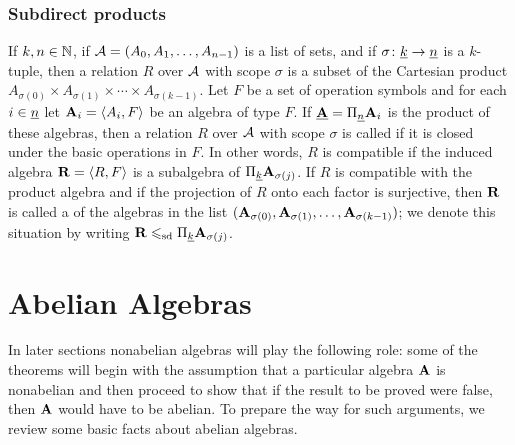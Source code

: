\subsubsection{Subdirect products}
If $k, n \in \mathbb{N}$, if $\mathcal{A} = (A_0, A_1, \dots, A_{n-1})$ is a list
of sets, and if $\sigma \colon \underline{k} \to \underline{n}$ is a $k$-tuple, 
then a relation $R$ over $\mathcal{A}$ with scope $\sigma$ is
a subset of the Cartesian product
$A_{\sigma(0)} \times A_{\sigma(1)} \times \cdots \times A_{\sigma(k-1)}$.
Let $F$ be a set of operation symbols and for each $i\in \underline{n}$
let $\mathbf{A}_i = \langle A_i, F\rangle$ be an algebra of type $F$.
If $\underline{\mathbf{A}} = \Pi_{\underline{n}}\mathbf{A}_i$
is the product of these algebras, then a relation 
$R$ over $\mathcal{A}$ with scope $\sigma$ is called 
 if 
it is closed under the basic operations in $F$.
In other words, $R$ is compatible if the induced algebra $\mathbf{R}= \langle R,F\rangle$ 
is a subalgebra of $\Pi_{\underline{k}} \mathbf{A}_{\sigma(j)}$.
If $R$ is compatible with the product algebra
and if the projection of $R$ onto each factor is surjective,
then $\mathbf{R}$ is
called a  of the algebras
in the list
$(\mathbf{A}_{\sigma(0)}, \mathbf{A}_{\sigma(1)}, \dots, \mathbf{A}_{\sigma(k-1)})$; 
we denote this situation by writing
           {$\mathbf{R} \leqslant_{\mathrm{sd}} \Pi_{\underline{k}} \mathbf{A}_{\sigma(j)}$.}

\section{Abelian Algebras}
In later sections nonabelian algebras will play the following role:
some of the theorems will begin with the assumption 
that a particular algebra $\mathbf{A}$ is nonabelian and then proceed to show that 
if the result to be proved were false, then $\mathbf{A}$ would have to be abelian. 
To prepare the way for such arguments, we review some basic facts about abelian
algebras. 


